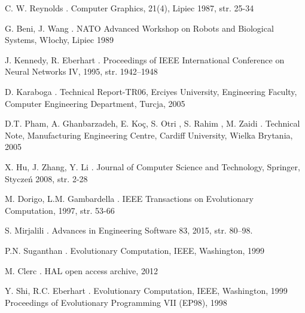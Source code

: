 

\begin{thebibliography}{1}

C. W. Reynolds
.
\newblock Computer Graphics, 21(4), Lipiec 1987, str. 25-34

G. Beni, J. Wang
.
\newblock NATO Advanced Workshop on Robots and Biological Systems, Włochy, Lipiec 1989

J. Kennedy, R. Eberhart
.
\newblock Proceedings of IEEE International Conference on Neural Networks IV, 1995, str. 1942–1948


D. Karaboga
.
\newblock  Technical Report-TR06, Erciyes University, Engineering Faculty, Computer Engineering Department, Turcja, 2005


D.T. Pham, A. Ghanbarzadeh, E. Koç, S. Otri , S. Rahim , M. Zaidi 
.
\newblock Technical Note, Manufacturing Engineering Centre, Cardiff University, Wielka Brytania, 2005


X. Hu, J. Zhang, Y. Li
.
\newblock Journal of Computer Science and Technology, Springer, Styczeń 2008, str. 2-28


M. Dorigo, L.M. Gambardella
.
\newblock IEEE Transactions on Evolutionary Computation, 1997, str. 53-66


S. Mirjalili
.
\newblock Advances in Engineering Software 83, 2015, str. 80–98.


P.N. Suganthan
.
\newblock Evolutionary Computation, IEEE, Washington, 1999


M. Clerc
.
\newblock HAL open access archive, 2012


Y. Shi, R.C. Eberhart
.
\newblock Evolutionary Computation, IEEE, Washington, 1999
Proceedings of Evolutionary Programming VII (EP98), 1998



\end{thebibliography}
